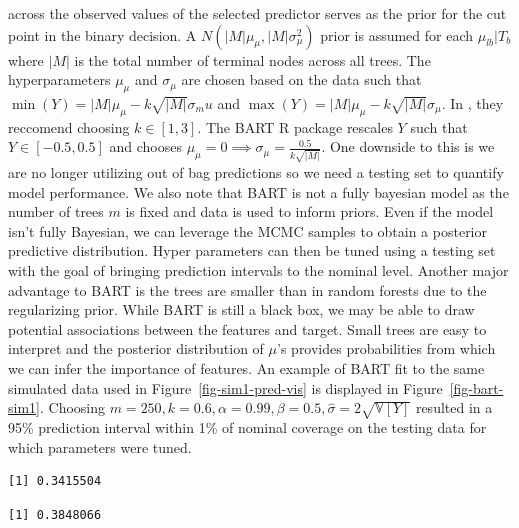 \documentclass[
  12pt,
  letterpaper,
  DIV=11,
  numbers=noendperiod]{scrartcl}
\begin{document}
across the observed values of the selected predictor serves as the prior
for the cut point in the binary decision. A
\(N(|M|\mu_\mu,|M|\sigma^2_\mu)\) prior is assumed for each
\(\mu_{lb}|T_b\) where \(|M|\) is the total number of terminal nodes
across all trees. The hyperparameters \(\mu_\mu\) and \(\sigma_\mu\) are
chosen based on the data such that
\(\min(Y)=|M|\mu_\mu-k\sqrt{|M|}\sigma_mu\) and
\(\max(Y)=|M|\mu_\mu-k\sqrt{|M|}\sigma_\mu\). In \citep{bart_paper},
they reccomend choosing \(k\in[1,3]\). The BART R package rescales \(Y\)
such that \(Y\in[-0.5, 0.5]\) and chooses
\(\mu_\mu=0\implies\sigma_\mu=\frac{0.5}{k\sqrt{|M|}}\). One downside to
this is we are no longer utilizing out of bag predictions so we need a
testing set to quantify model performance. We also note that BART is not
a fully bayesian model as the number of trees \(m\) is fixed and data is
used to inform priors. Even if the model isn't fully Bayesian, we can
leverage the MCMC samples to obtain a posterior predictive distribution.
Hyper parameters can then be tuned using a testing set with the goal of
bringing prediction intervals to the nominal level. Another major
advantage to BART is the trees are smaller than in random forests due to
the regularizing prior. While BART is still a black box, we may be able
to draw potential associations between the features and target. Small
trees are easy to interpret and the posterior distribution of \(\mu\)'s
provides probabilities from which we can infer the importance of
features. An example of BART fit to the same simulated data used in
Figure~\ref{fig-sim1-pred-vis} is displayed in
Figure~\ref{fig-bart-sim1}. Choosing
\(m=250,k=0.6,\alpha=0.99,\beta=0.5,\hat\sigma=2\sqrt{\mathbb{V}[Y]}\)
resulted in a 95\% prediction interval within 1\% of nominal coverage on
the testing data for which parameters were tuned.

\begin{verbatim}
[1] 0.3415504
\end{verbatim}

\begin{verbatim}
[1] 0.3848066
\end{verbatim}
\end{document}

